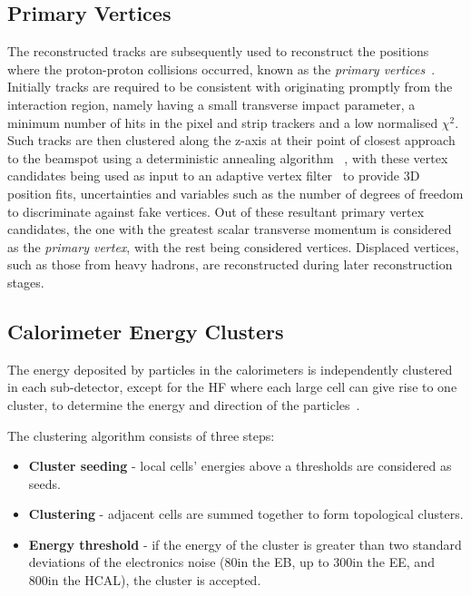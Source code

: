\subsection{Primary Vertices}\label{subsec:vertices}
The reconstructed tracks are subsequently used to reconstruct the positions where the proton-proton collisions occurred, known as the \emph{primary vertices}~\cite{Speer:2006mh,Chatrchyan:2014fea}.
Initially tracks are required to be consistent with originating promptly from the interaction region, namely having a small transverse impact parameter, a minimum number of hits in the pixel and strip trackers and a low normalised $\chi^{2}$.
Such tracks are then clustered along the z-axis at their point of closest approach to the beamspot using a deterministic annealing algorithm	~\cite{Kenneth:1998i}, with these vertex candidates being used as input to an adaptive vertex filter~\cite{Fruhwirth:2007hz} to provide 3D position fits, uncertainties and variables such as the number of degrees of freedom to discriminate against fake vertices.
Out of these resultant primary vertex candidates, the one with the greatest scalar transverse momentum is considered as the \emph{primary vertex}, with the rest being considered \PU vertices.
Displaced vertices, such as those from heavy hadrons, are reconstructed during later reconstruction stages.

\subsection{Calorimeter Energy Clusters}\label{subsec:clustering}
The energy deposited by particles in the calorimeters is independently clustered in each sub-detector, except for the HF where each large cell can give rise to one cluster, to determine the energy and direction of the particles~\cite{CMS:2009nxa}.

The clustering algorithm consists of three steps:
\begin{itemize}
\item \textbf{Cluster seeding} - local cells' energies above a thresholds are considered as seeds.
\item \textbf{Clustering} - adjacent cells are summed together to form topological clusters.
\item \textbf{Energy threshold} - if the energy of the cluster is greater than two standard deviations of the electronics noise (80\MeV in the EB, up to 300\MeV in the EE, and 800\MeV in the HCAL), the cluster is accepted.
\end{itemize}


